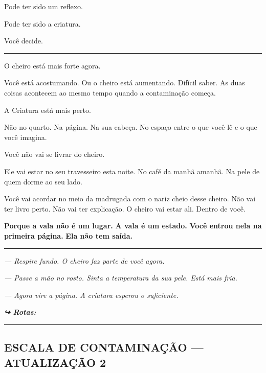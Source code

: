 \noindent Pode ter sido um reflexo.

\noindent Pode ter sido a criatura.

\noindent Você decide.

\vspace{0.5em}\noindent\rule{\textwidth}{0.5pt}\vspace{0.5em}

\noindent O cheiro está mais forte agora.

\noindent Você está acostumando. Ou o cheiro está aumentando. Difícil saber. As duas coisas acontecem ao mesmo tempo quando a contaminação começa.

\noindent A Criatura está mais perto.

\noindent Não no quarto. Na página. Na sua cabeça. No espaço entre o que você lê e o que você imagina.

\noindent Você não vai se livrar do cheiro.

\noindent Ele vai estar no seu travesseiro esta noite.
No café da manhã amanhã.
Na pele de quem dorme ao seu lado.

\noindent Você vai acordar no meio da madrugada com o nariz cheio desse cheiro.
Não vai ter livro perto.
Não vai ter explicação.
O cheiro vai estar ali. Dentro de você.

\noindent \textbf{Porque a vala não é um lugar.}
\textbf{A vala é um estado.}
\textbf{Você entrou nela na primeira página.}
\textbf{Ela não tem saída.}

\vspace{0.5em}\noindent\rule{\textwidth}{0.5pt}\vspace{0.5em}

\noindent \textit{--- Respire fundo. O cheiro faz parte de você agora.}

\noindent \textit{--- Passe a mão no rosto. Sinta a temperatura da sua pele. Está mais fria.}

\noindent \textit{--- Agora vire a página. A criatura esperou o suficiente.}


\noindent\textit{\textbf{↪ Rotas:}  \rotasep {}}

\vspace{0.5em}\noindent\rule{\textwidth}{0.5pt}\vspace{0.5em}

\subsection*{ESCALA DE CONTAMINAÇÃO --- ATUALIZAÇÃO 2}

